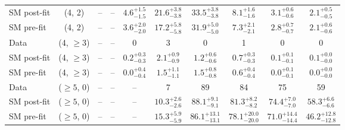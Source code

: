{\begin{table}[h!]
{\begin{tabular}{lccccccccc}
    SM post-fit & (4, 2)           & --                            & --                            & $4.6^{+ 1.5 }_{- 1.5 }$     & $21.6^{+ 3.8 }_{- 3.8 }$    & $33.5^{+ 3.8 }_{- 3.8 }$    & $8.1^{+ 1.6 }_{- 1.6 }$     & $3.1^{+ 0.6 }_{- 0.6 }$    & $2.1^{+ 0.5 }_{- 0.5 }$    \\[0.5ex] 
    SM pre-fit  & (4, 2)           & --                            & --                            & $3.6^{+ 2.0 }_{- 2.0 }$     & $17.2^{+ 5.8 }_{- 5.8 }$    & $31.9^{+ 5.0 }_{- 5.0 }$    & $7.3^{+ 2.1 }_{- 2.1 }$     & $2.8^{+ 0.7 }_{- 0.7 }$    & $2.1^{+ 0.6 }_{- 0.6 }$    \\[0.5ex] 
    Data        & (4, $\ge3$)      & --                            & --                            & 0                           & 3                           & 0                           & 1                           & 0                          & 0                          \\[0.5ex] 
    SM post-fit & (4, $\ge3$)      & --                            & --                            & $0.2^{+ 0.3 }_{- 0.3 }$     & $2.1^{+ 0.9 }_{- 0.9 }$     & $1.2^{+ 0.6 }_{- 0.6 }$     & $0.7^{+ 0.3 }_{- 0.3 }$     & $0.1^{+ 0.1 }_{- 0.1 }$    & $0.1^{+ 0.0 }_{- 0.0 }$    \\[0.5ex] 
    SM pre-fit  & (4, $\ge3$)      & --                            & --                            & $0.0^{+ 0.4 }_{- 0.4 }$     & $1.5^{+ 1.1 }_{- 1.1 }$     & $1.5^{+ 0.8 }_{- 0.8 }$     & $0.6^{+ 0.4 }_{- 0.4 }$     & $0.0^{+ 0.1 }_{- 0.1 }$    & $0.0^{+ 0.0 }_{- 0.0 }$    \\[0.5ex] 
    Data        & ($\ge5$, 0)      & --                            & --                            & --                          & 7                           & 89                          & 84                          & 75                         & 59                         \\[0.5ex] 
    SM post-fit & ($\ge5$, 0)      & --                            & --                            & --                          & $10.3^{+ 2.6 }_{- 2.6 }$    & $88.1^{+ 9.1 }_{- 9.1 }$    & $81.3^{+ 8.2 }_{- 8.2 }$    & $74.4^{+ 7.0 }_{- 7.0 }$   & $58.3^{+ 6.6 }_{- 6.6 }$   \\[0.5ex] 
    SM pre-fit  & ($\ge5$, 0)      & --                            & --                            & --                          & $15.3^{+ 5.9 }_{- 5.9 }$    & $86.1^{+ 13.1 }_{- 13.1 }$  & $78.1^{+ 20.0 }_{- 20.0 }$  & $71.0^{+ 14.4 }_{- 14.4 }$ & $46.2^{+ 12.8 }_{- 12.8 }$ \\[0.5ex] 

\end{tabular}}
\end{table}}
